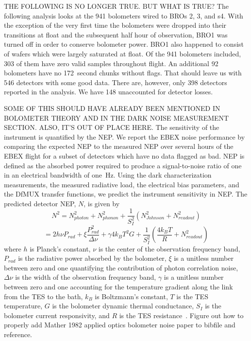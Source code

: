 THE FOLLOWING IS NO LONGER TRUE. BUT WHAT IS TRUE?
The following analysis looks at the 941 bolometers wired to \ac{BRO}s 2, 3, and s4. 
With the exception of the very first time the bolometers were dropped into their transitions at float and the subsequent half hour of observation, \ac{BRO}1 was turned off in order to conserve bolometer power. \ac{BRO}1 also happened to consist of wafers which were largely saturated at float. 
Of the 941 bolometers included, 303 of them have zero valid samples throughout flight. 
An additional 92 bolometers have no 172~second chunks without flags. 
That should leave us with 546 detectors with some good data. 
There are, however, only 398 detectors reported in the analysis. 
We have 148 unaccounted for detector losses. 

SOME OF THIS SHOULD HAVE ALREADY BEEN MENTIONED IN BOLOMETER THEORY AND IN THE DARK NOISE MEASUREMENT SECTION. ALSO, IT'S OUT OF PLACE HERE.
The sensitivity of the instrument is quantified by the \ac{NEP}. 
We report the \ac{EBEX} noise performance by comparing the expected \ac{NEP} to the measured \ac{NEP} over several hours of the \ac{EBEX} flight for a subset of detectors which have no data flagged as bad. 
\ac{NEP} is defined as the absorbed power required to produce a signal-to-noise ratio of one in an electrical bandwidth of one~Hz. 
Using the dark characterization measurements, the measured radiative load, the electrical bias parameters, and the \ac{DfMUX} transfer functions, we predict the instrument sensitivity in \ac{NEP}. 
The predicted detector \ac{NEP}, $N$, is given by 
\begin{equation}
N^{2} = N_{photon}^2 + N_{phonon}^2 + \frac{1}{S_I^2} ( N_{Johnson}^2 + N_{readout}^2 )
\end{equation}
\begin{equation}
= 2h\nu P_{rad} + \xi \frac{P_{rad}^2}{\Delta \nu} + \gamma 4k_{B} T^2 G + \frac{1}{S_I^2} (\frac{4k_BT}{R} + N_{readout}^2 )
\end{equation}
where $h$ is Planck's constant, $\nu$ is the center of the observation frequency band, $P_{rad}$ is the radiative power absorbed by the bolometer, $\xi$ is a unitless number between zero and one quantifying the contribution of photon correlation noise, $\Delta \nu$ is the width of the observation frequency band, $\gamma$ is a unitless number between zero and one accounting for the temperature gradient along the link from the \ac{TES} to the bath, $k_{B}$ is Boltzmann's constant, $T$ is the \ac{TES} temperature, $G$ is the bolometer dynamic thermal conductance, $S_{I}$ is the bolometer current responsivity, and $R$ is the \ac{TES} resistance~\citep{Mather1982a}. 
Figure out how to properly add Mather 1982 applied optics bolometer noise paper to bibfile and reference.



